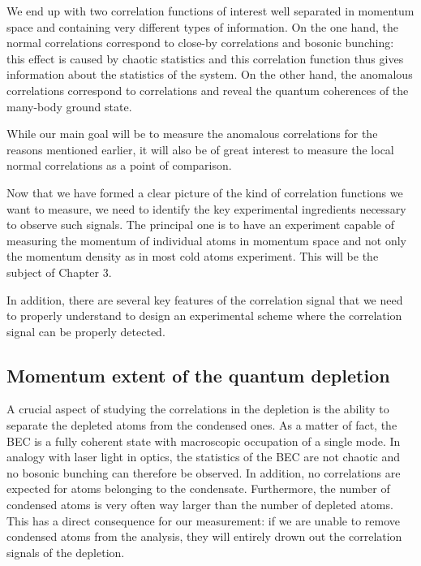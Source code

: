 We end up with two correlation functions of interest well separated in momentum space and containing very different types of information. On the one hand, the normal correlations correspond to close-by correlations and bosonic bunching: this effect is caused by chaotic statistics and this correlation function thus gives information about the statistics of the system. On the other hand, the anomalous correlations correspond to \kmk correlations and reveal the quantum coherences of the many-body ground state.

 While our main goal will be to measure the anomalous \kmk correlations for the reasons mentioned earlier, it will also be of great interest to measure the local normal correlations as a point of comparison. 





Now that we have formed a clear picture of the kind of correlation functions we want to measure, we need to identify the key experimental ingredients necessary to observe such signals. The principal one is to have an experiment capable of measuring the momentum of individual atoms in momentum space and not only the momentum density as in most cold atoms experiment. This will be the subject of Chapter 3. 

In addition, there are several key features of the \kmk correlation signal that we need to properly understand to design an experimental scheme where the \kmk correlation signal can be properly detected.


\subsection{Momentum extent of the quantum depletion}

A crucial aspect of studying the correlations in the depletion is the ability to separate the depleted atoms from the condensed ones. As a matter of fact, the BEC is a fully coherent state with macroscopic occupation of a single mode. In analogy with laser light in optics, the statistics of the BEC are not chaotic and no bosonic bunching can therefore be observed. In addition, no \kmk correlations are expected for atoms belonging to the condensate. Furthermore, the number of condensed atoms is very often way larger than the number of depleted atoms. This has a direct consequence for our measurement: if we are unable to remove condensed atoms from the analysis, they will entirely drown out the correlation signals of the depletion.

